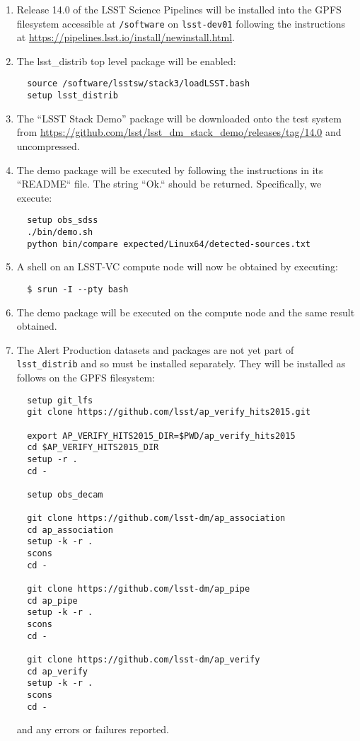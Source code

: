 \begin{enumerate}

  \item{Release 14.0 of the LSST Science Pipelines will be installed into the
  GPFS filesystem accessible at \texttt{/software} on \texttt{lsst-dev01}
  following the instructions at
  \url{https://pipelines.lsst.io/install/newinstall.html}.}

  \item{The lsst\_distrib top level package will be enabled:

  \begin{verbatim}
  source /software/lsstsw/stack3/loadLSST.bash
  setup lsst_distrib
  \end{verbatim}
  }

  \item{The ``LSST Stack Demo'' package will be downloaded onto the test
  system from
  \url{https://github.com/lsst/lsst_dm_stack_demo/releases/tag/14.0} and
  uncompressed.}

  \item{The demo package will be executed by following the instructions in its
  ``README`` file. The string ``Ok.`` should be returned.  
  Specifically, we execute:
  \begin{verbatim}
  setup obs_sdss
  ./bin/demo.sh
  python bin/compare expected/Linux64/detected-sources.txt
  \end{verbatim}
  }

  \item{A shell on an LSST-VC compute node will now be obtained by executing:

  \begin{verbatim}
  $ srun -I --pty bash
  \end{verbatim}
  }

  \item{The demo package will be executed on the compute node and the same
  result obtained.}

  \item{The Alert Production datasets and packages are not yet part of \texttt{lsst\_distrib} and so must be installed separately.   They will be installed as follows on the GPFS filesystem:

  \begin{verbatim}
  setup git_lfs
  git clone https://github.com/lsst/ap_verify_hits2015.git

  export AP_VERIFY_HITS2015_DIR=$PWD/ap_verify_hits2015
  cd $AP_VERIFY_HITS2015_DIR
  setup -r .
  cd -

  setup obs_decam

  git clone https://github.com/lsst-dm/ap_association
  cd ap_association
  setup -k -r .
  scons 
  cd - 

  git clone https://github.com/lsst-dm/ap_pipe
  cd ap_pipe
  setup -k -r .
  scons 
  cd - 

  git clone https://github.com/lsst-dm/ap_verify
  cd ap_verify
  setup -k -r .
  scons 
  cd - 
  \end{verbatim}

  and any errors or failures reported.}

\end{enumerate}
